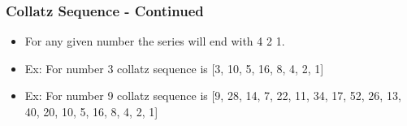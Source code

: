 \documentclass[14pt]{beamer}
\begin{document}
    \begin{frame}[containsverbatim]
        \frametitle{Collatz Sequence - Continued}
        \begin{itemize}
        \item For any given number the series will end with 4 2 1.
        \item Ex: For number 3 collatz sequence is [3, 10, 5, 16, 8, 4, 2, 1]
        \item Ex: For number 9 collatz sequence is [9, 28, 14, 7, 22, 11, 34, 17, 52, 26, 13, 40, 20, 10, 5, 16, 8, 4, 2, 1]

        \end{itemize}
    \end{frame}
\end{document}
